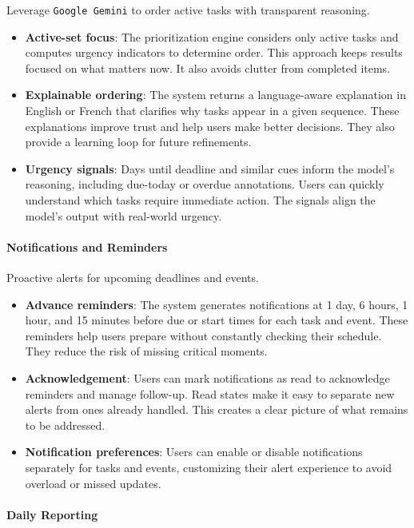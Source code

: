 \documentclass[12pt,a4paper]{article}
\begin{document}
Leverage \texttt{Google Gemini} \cite{gemini2025flash} to order active tasks with transparent reasoning.
\begin{itemize}
  \item \textbf{Active-set focus}: The prioritization engine considers only active tasks and computes urgency indicators to determine order. This approach keeps results focused on what matters now. It also avoids clutter from completed items.
  \item \textbf{Explainable ordering}: The system returns a language-aware explanation in English or French that clarifies why tasks appear in a given sequence. These explanations improve trust and help users make better decisions. They also provide a learning loop for future refinements.
  \item \textbf{Urgency signals}: Days until deadline and similar cues inform the model's reasoning, including due-today or overdue annotations. Users can quickly understand which tasks require immediate action. The signals align the model's output with real-world urgency.
\end{itemize}

\paragraph{Notifications and Reminders}\mbox{}

Proactive alerts for upcoming deadlines and events.
\begin{itemize}
  \item \textbf{Advance reminders}: The system generates notifications at 1 day, 6 hours, 1 hour, and 15 minutes before due or start times for each task and event. These reminders help users prepare without constantly checking their schedule. They reduce the risk of missing critical moments.
  \item \textbf{Acknowledgement}: Users can mark notifications as read to acknowledge reminders and manage follow-up. Read states make it easy to separate new alerts from ones already handled. This creates a clear picture of what remains to be addressed.
  \item \textbf{Notification preferences}: Users can enable or disable notifications separately for tasks and events, customizing their alert experience to avoid overload or missed updates.

\end{itemize}

\paragraph{Daily Reporting}\mbox{}
\end{document}
